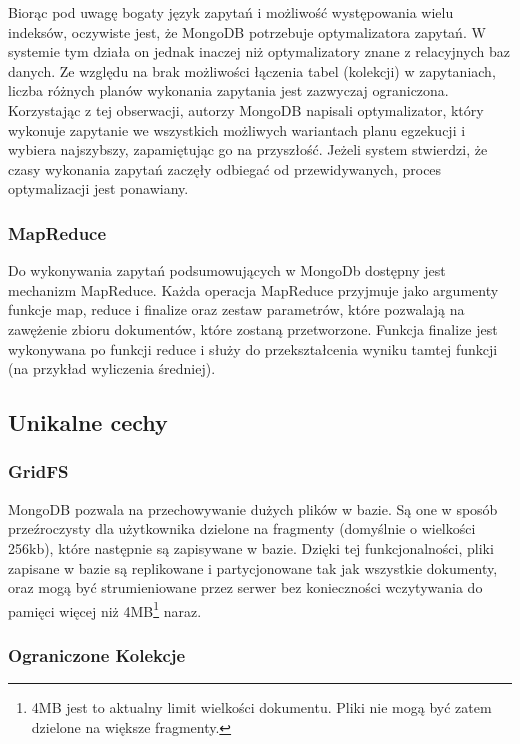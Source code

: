 Biorąc pod uwagę bogaty język zapytań i możliwość występowania wielu indeksów, oczywiste jest, że MongoDB potrzebuje optymalizatora zapytań.
W systemie tym działa on jednak inaczej niż optymalizatory znane z relacyjnych baz danych.
Ze względu na brak możliwości łączenia tabel (kolekcji) w zapytaniach, liczba różnych planów wykonania zapytania jest zazwyczaj ograniczona.
Korzystając z tej obserwacji, autorzy MongoDB napisali optymalizator, który wykonuje zapytanie we wszystkich możliwych wariantach planu egzekucji i wybiera najszybszy, zapamiętując go na przyszłość.
Jeżeli system stwierdzi, że czasy wykonania zapytań zaczęły odbiegać od przewidywanych, proces optymalizacji jest ponawiany.

\subsubsection*{MapReduce}

Do wykonywania zapytań podsumowujących w MongoDb dostępny jest mechanizm MapReduce.
Każda operacja MapReduce przyjmuje jako argumenty funkcje map, reduce i finalize oraz zestaw parametrów, które pozwalają na zawężenie zbioru dokumentów, które zostaną przetworzone.
Funkcja finalize jest wykonywana po funkcji reduce i służy do przekształcenia wyniku tamtej funkcji (na przykład wyliczenia średniej).

\subsection*{Unikalne cechy}

\subsubsection*{GridFS}

MongoDB pozwala na przechowywanie dużych plików w bazie.
Są one w sposób przeźroczysty dla użytkownika dzielone na fragmenty (domyślnie o wielkości 256kb), które następnie są zapisywane w bazie.
Dzięki tej funkcjonalności, pliki zapisane w bazie są replikowane i partycjonowane tak jak wszystkie dokumenty, oraz mogą być strumieniowane przez serwer bez konieczności wczytywania do pamięci więcej niż 4MB\footnote{4MB jest to aktualny limit wielkości dokumentu. Pliki nie mogą być zatem dzielone na większe fragmenty.} naraz.

\subsubsection*{Ograniczone Kolekcje}

